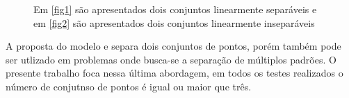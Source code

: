 \begin{figure}
\centering
{}
\qquad
{}
\label{img:linear_sepa}
\caption{Em \ref{fig1} são apresentados dois conjuntos linearmente separáveis e em \ref{fig2} são apresentados dois conjuntos linearmente inseparáveis}
\end{figure}

A proposta do modelo e separa dois conjuntos de pontos, porém também pode ser utlizado em problemas onde busca-se a separação de múltiplos padrões. O presente trabalho foca nessa última abordagem, em todos os testes realizados o número de conjutnso de pontos é igual ou maior que três.

